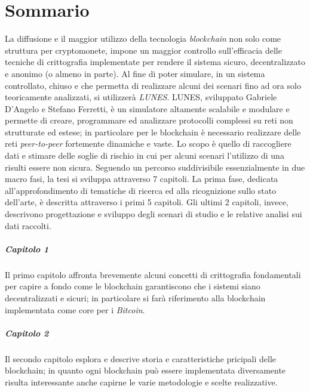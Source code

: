 \chapter{Sommario}
La diffusione e il maggior utilizzo della tecnologia \textit{blockchain} non solo come struttura per cryptomonete, impone un maggior controllo sull'efficacia delle tecniche di crittografia implementate per rendere il sistema sicuro, decentralizzato e anonimo (o almeno in parte).\newline
Al fine di poter simulare, in un sistema controllato, chiuso e che permetta di realizzare alcuni dei scenari fino ad ora solo teoricamente analizzati, si utilizzerà \textit{LUNES}\cite{gdalunes}.\newline
LUNES, sviluppato Gabriele D'Angelo e Stefano Ferretti, è un simulatore altamente scalabile e modulare e permette di creare, programmare ed analizzare protocolli complessi su reti non strutturate ed estese; in particolare per le blockchain è necessario realizzare delle reti \textit{peer-to-peer} fortemente dinamiche e vaste.\newline
Lo scopo è quello di raccogliere dati e stimare delle soglie di rischio in cui per alcuni scenari l'utilizzo di una  risulti essere non sicura.\newline\newline
Seguendo un percorso suddivisibile essenzialmente in due macro fasi, la tesi si sviluppa attraverso 7 capitoli. La prima fase, dedicata all'approfondimento di tematiche di ricerca ed alla ricognizione sullo stato dell'arte, è descritta attraverso i primi 5 capitoli. Gli ultimi 2 capitoli, invece, descrivono progettazione e sviluppo degli scenari di studio e le relative analisi sui dati raccolti.

\paragraph{Capitolo 1}
Il primo capitolo affronta brevemente alcuni concetti di crittografia fondamentali per capire a fondo come le blockchain garantiscono che i sistemi siano decentralizzati e sicuri; in particolare si farà riferimento alla blockchain implementata come core per i \textit{Bitcoin}.

\paragraph{Capitolo 2}
Il secondo capitolo esplora e descrive storia e caratteristiche pricipali delle blockchain; in quanto ogni blockchain può essere implementata diversamente risulta interessante anche capirne le varie metodologie e scelte realizzative.

